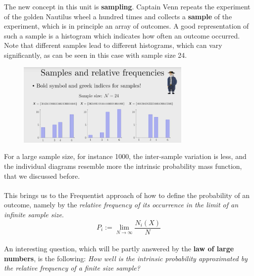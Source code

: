 \documentclass[12pt, a4paper]{scrartcl}
\begin{document}
The new concept in this unit is \textbf{sampling}.
Captain Venn repeats the experiment of the golden Nautilus wheel a hundred times and collects a \textbf{sample} of the experiment, which is in principle an array of outcomes. 
A good representation of such a sample is a histogram which indicates how often an outcome occurred.
Note that different samples lead to different histograms, which can vary significantly, as can be seen in this case with sample size 24. 
\begin{figure}[H]
	\centering
	\includegraphics[width=0.75\textwidth]{2_3.png}
\end{figure}
For a large sample size, for instance 1000, the inter-sample variation is less, and the individual diagrams resemble more the intrinsic probability mass function, that we discussed before.\\

\\

This brings us to the Frequentist approach of how to define the probability of an outcome, namely by the \textit{relative frequency of its occurrence in the limit of an infinite sample size}.\\

\begin{equation*}\boxed{P_i:= \lim_{N\rightarrow \infty}\frac{N_i(X)}{N}}\end{equation*}\\
An interesting question, which will be partly answered by the \textbf{law of large numbers}, is the following: \textit{How well is the intrinsic probability approximated by the relative frequency of a finite size sample?}\\
\end{document}
